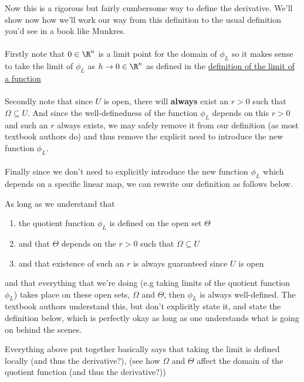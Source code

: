 		\begin{remark}
			Now this is a rigorous but fairly cumbersome way to define the derivative. We'll show now how we'll work our way from this definition to the usual definition you'd see in a book like Munkres. 
			\\ \\
			Firstly note that $0 \in \R^n$ is a  limit point for the domain of $\phi_L$ so it makes sense to take the limit of $\phi_L$ as $h \to 0 \in \R^n$ as defined in the \hyperlink{limit-function-defn}{definition of the limit of a function}
			\\ \\
			Secondly note that since $U$ is open, there will \textbf{always} exist an $r > 0$ such that $\Omega \subseteq U$. And since the well-definedness of the function $\phi_L$ depends on this $r > 0$ and such an $r$ always exists, we may safely remove it from our definition (as most textbook authors do) and thus remove the explicit need to introduce the new function $\phi_L$. 
			\\ \\
			Finally since we don't need to explicitly introduce the new function $\phi_L$ which depends on a specific linear map, we can rewrite our definition as follows below.
		\end{remark} 
		
		\begin{point}
			As long as we understand that 
			
			\begin{enumerate}
				\item the quotient function $\phi_L$ is defined on the open set $\Theta$
				\item  and that $\Theta$ depends on the $r > 0$ such that $\Omega \subseteq U$
				\item  and that existence of such an $r$ is always guaranteed since $U$ is open 
			\end{enumerate}
			and that everything that we're doing (e.g taking limits of the quotient function $\phi_L$) takes place on these open sets, $\Omega$ and $\Theta$, then $\phi_L$ is always well-defined. The textbook authors understand this, but don't explicitly state it, and state the definition below, which is perfectly okay as long as one understands what is going on behind the scenes.
		\end{point}
		
		\begin{point}
			Everything above put together basically says that taking the limit is defined locally (and thus the derivative?), (see how $\Omega$ and $\Theta$ affect the domain of the quotient function (and thus the derivative?))
		\end{point}
		
